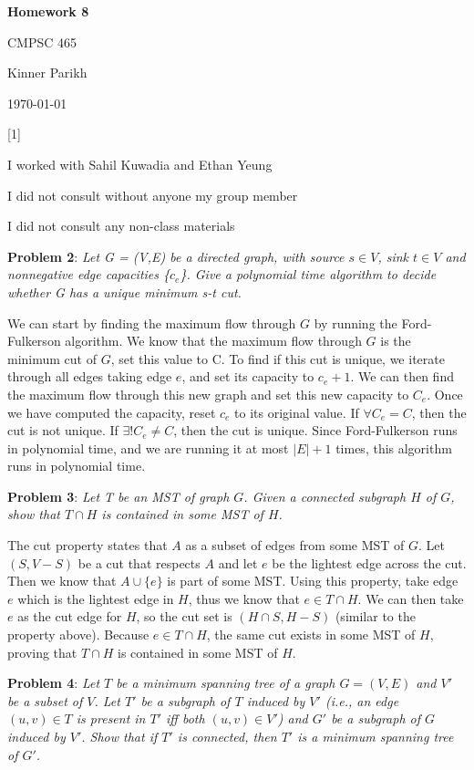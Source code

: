 \documentclass{article} %
\newcommand{\question}[2][]{\begin{flushleft}
        \textbf{Problem #1}: \textit{#2}

\end{flushleft}}
\newcommand{\maketitletwo}[2][]{\begin{center}
        \Large{\textbf{Homework #1}
            
            CMPSC 465} %
        \vspace{5pt}
        
        \normalsize{Kinner Parikh  %
        
        \today}        %
        \vspace{40pt}


        \newpage
        
\end{center}}
\begin{document}
    \maketitletwo[8]  %

    \question[1]{}
    \begin{center}
        
        I worked with Sahil Kuwadia and Ethan Yeung
    
        I did not consult without anyone my group member
    
        I did not consult any non-class materials
    \end{center}
    
    \newpage

    \question[2]{Let G = (V,E) be a directed graph, with source $s\in V$, sink $t \in V$ and nonnegative edge capacities \{$c_e$\}. Give a polynomial time algorithm to decide whether G has a unique minimum s-t cut.}

    We can start by finding the maximum flow through $G$ by running the Ford-Fulkerson algorithm. We know that the maximum flow through $G$ is the minimum cut of $G$, set this value to C. To find if this cut is unique, we iterate through all edges taking edge $e$, and set its capacity to $c_e + 1$. We can then find the maximum flow through this new graph and set this new capacity to $C_e$. Once we have computed the capacity, reset $c_e$ to its original value. If $\forall C_e = C$, then the cut is not unique. If $\exists! C_e \neq C$, then the cut is unique. Since Ford-Fulkerson runs in polynomial time, and we are running it at most $|E| + 1$ times, this algorithm runs in polynomial time.

    \newpage

    \question[3]{Let T be an MST of graph $G$. Given a connected subgraph $H$ of $G$, show that $T \cap H$ is contained in some MST of $H$.}


    The cut property states that $A$ as a subset of edges from some MST of $G$. Let $(S, V-S)$ be a cut that respects $A$ and let $e$ be the lightest edge across the cut. Then we know that $A \cup \{e\}$ is part of some MST. Using this property, take edge $e$ which is the lightest edge in $H$, thus we know that $e \in T \cap H$. We can then take $e$ as the cut edge for $H$, so the cut set is $(H \cap S, H - S)$ (similar to the property above). Because $e \in T \cap H$, the same cut exists in some MST of $H$, proving that $T \cap H$ is contained in some MST of $H$. 

    \newpage

    \question[4]{Let $T$ be a minimum spanning tree of a graph $G = (V,E)$ and $V'$ be a subset of $V$. Let $T'$ be a subgraph of $T$ induced by $V'$ (i.e., an edge $(u,v) \in T$ is present in $T'$ iff both $(u,v) \in V'$) and $G'$ be a subgraph of $G$ induced by $V'$. Show that if $T'$ is connected, then $T'$ is a minimum spanning tree of $G'$.}
\end{document}

